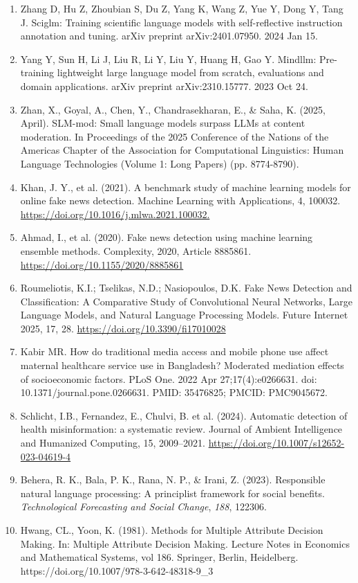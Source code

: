 \documentclass[]{article}
\begin{document}
\begin{enumerate}
  Acikgoz EC, Ince OB, Bench R, Boz AA, Kesen I, Erdem A, Erdem E.
  Hippocrates: An open-source framework for advancing large language
  models in healthcare. arXiv preprint arXiv:2404.16621. 2024 Apr 25.
\item
  Zhang D, Hu Z, Zhoubian S, Du Z, Yang K, Wang Z, Yue Y, Dong Y, Tang
  J. Sciglm: Training scientific language models with self-reflective
  instruction annotation and tuning. arXiv preprint arXiv:2401.07950.
  2024 Jan 15.
\item
  Yang Y, Sun H, Li J, Liu R, Li Y, Liu Y, Huang H, Gao Y. Mindllm:
  Pre-training lightweight large language model from scratch,
  evaluations and domain applications. arXiv preprint arXiv:2310.15777.
  2023 Oct 24.
\item
  Zhan, X., Goyal, A., Chen, Y., Chandrasekharan, E., \& Saha, K. (2025,
  April). SLM-mod: Small language models surpass LLMs at content
  moderation. In Proceedings of the 2025 Conference of the Nations of
  the Americas Chapter of the Association for Computational Linguistics:
  Human Language Technologies (Volume 1: Long Papers) (pp. 8774-8790).
\item
  Khan, J. Y., et al. (2021). A benchmark study of machine learning
  models for online fake news detection. Machine Learning with
  Applications, 4, 100032.
  \href{https://doi.org/10.1016/j.mlwa.2021.100032}{https://doi.org/10.1016/j.mlwa.2021.100032.}
\item
  Ahmad, I., et al. (2020). Fake news detection using machine learning
  ensemble methods. Complexity, 2020, Article 8885861.
  \url{https://doi.org/10.1155/2020/8885861}
\item
  Roumeliotis, K.I.; Tselikas, N.D.; Nasiopoulos, D.K. Fake News
  Detection and Classification: A Comparative Study of Convolutional
  Neural Networks, Large Language Models, and Natural Language
  Processing Models. Future Internet 2025, 17, 28.
  \url{https://doi.org/10.3390/fi17010028}
\item
  Kabir MR. How do traditional media access and mobile phone use affect
  maternal healthcare service use in Bangladesh? Moderated mediation
  effects of socioeconomic factors. PLoS One. 2022 Apr
  27;17(4):e0266631. doi: 10.1371/journal.pone.0266631. PMID: 35476825;
  PMCID: PMC9045672.
\item
  Schlicht, I.B., Fernandez, E., Chulvi, B. et al. (2024). Automatic
  detection of health misinformation: a systematic review. Journal of
  Ambient Intelligence and Humanized Computing, 15, 2009--2021.
  \url{https://doi.org/10.1007/s12652-023-04619-4}
\item
  Behera, R. K., Bala, P. K., Rana, N. P., \& Irani, Z. (2023).
  Responsible natural language processing: A principlist framework for
  social benefits. \emph{Technological Forecasting and Social Change},
  \emph{188}, 122306.
\item
  Hwang, CL., Yoon, K. (1981). Methods for Multiple Attribute Decision
  Making. In: Multiple Attribute Decision Making. Lecture Notes in
  Economics and Mathematical Systems, vol 186. Springer, Berlin,
  Heidelberg. https://doi.org/10.1007/978-3-642-48318-9\_3
\end{enumerate}
\end{document}
